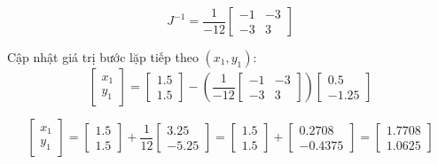 \[
J^{-1} = \frac{1}{-12} 
\begin{bmatrix}
-1 & -3 \\
-3 & 3
\end{bmatrix}
\]

Cập nhật giá trị bước lặp tiếp theo $(x_1, y_1)$:
\[
\begin{bmatrix}
x_1 \\
y_1
\end{bmatrix}
= 
\begin{bmatrix}
1.5 \\
1.5
\end{bmatrix}
- \left( \frac{1}{-12} 
\begin{bmatrix}
-1 & -3 \\
-3 & 3
\end{bmatrix}
\right)
\begin{bmatrix}
0.5 \\
-1.25
\end{bmatrix}
\]

\[
\begin{bmatrix}
x_1 \\
y_1
\end{bmatrix}
= 
\begin{bmatrix}
1.5 \\
1.5
\end{bmatrix}
+ \frac{1}{12} 
\begin{bmatrix}
3.25 \\
-5.25
\end{bmatrix}
= 
\begin{bmatrix}
1.5 \\
1.5
\end{bmatrix}
+ 
\begin{bmatrix}
0.2708 \\
-0.4375
\end{bmatrix}
= 
\begin{bmatrix}
1.7708 \\
1.0625
\end{bmatrix}
\]

